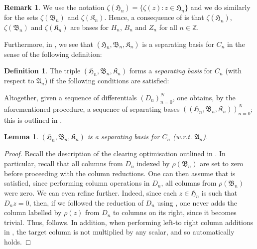 \documentclass[11pt, table, nothms]{amsart}
\newtheorem{lemma}[theorem]{Lemma}
\theoremstyle{definition}
\newtheorem{definition}[theorem]{Definition}
\newtheorem{remark}[theorem]{Remark}
\newcommand{\Z}{\mathbb{Z}}
\newcommand{\fA}{\mathfrak{A}}
\newcommand{\fB}{\mathfrak{B}}
\newcommand{\fH}{\mathfrak{H}}
\newcommand{\fK}{\mathfrak{K}}
\begin{document}
{\begin{remark}
    We use the notation $\zeta(\fH_n)=\{\zeta(z) \colon z \in \fH_n\}$ and we do similarly for the sets $\zeta(\fB_n)$ and $\zeta(\fK_n)$. Hence, a consequence of  is that $\zeta(\fH_n)$, $\zeta(\fB_n)$ and $\zeta(\fK_n)$ are bases for $H_n$, $B_n$ and $Z_n$ for all $n \in \Z$.
\end{remark}
\fi 
Furthermore, in , we see that $(\fH_n, \fB_n, \fK_n)$ is a separating basis for $C_n$ in the sense of the following definition:
\begin{definition} \label{def:sep_basis}
The triple $(\fH_n, \fB_n, \fK_n)$ forms a \emph{separating basis} for $C_n$ (with respect to $\fA_n$) if the following conditions are satisfied:
\end{definition}
Altogether, given a sequence of differentials $(D_n)_{n=0}^N$, one obtains, by the aforementioned procedure, a sequence of separating bases $((\fH_n, \fB_n, \fK_n))_{n=0}^N$; this is outlined in . 

\begin{lemma}\label{lem:separating-basis}
    $(\fH_n, \fB_n, \fK_n)$ is a separating basis for $C_n$ (w.r.t. $\fA_n$).
\end{lemma}
\begin{proof}
   Recall the description of the clearing optimisation outlined in . 
    In particular, recall that all columns from $D_n$ indexed by $\rho(\fB_n)$ are set to zero before proceeding with the column reductions. 
    One can then assume that  is satisfied, since performing column operations in $D_n$, all columns from $\rho(\fB_n)$ were zero. 
    We can even refine further.
    Indeed, since each $z \in \fH_n$ is such that $D_nz=0$, then, if we followed the reduction of $D_n$ using , one never adds the column labelled by $\rho(z)$ from $D_n$ to columns on its right, since it becomes trivial. 
    Thus,  follows.
    In addition, when performing left-to right column additions in , the target column is not multiplied by any scalar, and so  automatically holds.
\end{proof}

}
\end{document}
